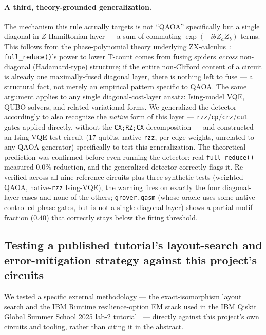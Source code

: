 \documentclass[9pt,twocolumn]{extarticle}
\begin{document}
\paragraph{A third, theory-grounded generalization.} The mechanism this
rule actually targets is not ``QAOA'' specifically but a single
diagonal-in-$Z$ Hamiltonian layer --- a sum of commuting
$\exp(-i\theta Z_aZ_b)$ terms. This follows from the phase-polynomial
theory underlying ZX-calculus~\cite{kissinger2019reducing}:
\texttt{full\_reduce()}'s power to lower T-count comes from fusing spiders
\emph{across} non-diagonal (Hadamard-type) structure; if the entire
non-Clifford content of a circuit is already one maximally-fused diagonal
layer, there is nothing left to fuse --- a structural fact, not merely an
empirical pattern specific to QAOA. The same argument applies to any
single diagonal-cost-layer ansatz: Ising-model VQE, QUBO solvers, and
related variational forms. We generalized the detector accordingly to
also recognize the \emph{native} form of this layer ---
\texttt{rzz}/\texttt{cp}/\texttt{crz}/\texttt{cu1} gates applied directly,
without the \texttt{CX;RZ;CX} decomposition --- and constructed an
Ising-VQE test circuit (17 qubits, native \texttt{rzz}, per-edge weights,
unrelated to any QAOA generator) specifically to test this
generalization. The theoretical prediction was confirmed before even
running the detector: real \texttt{full\_reduce()} measured $0.0\%$
reduction, and the generalized detector correctly flags it. Re-verified
across all nine reference circuits plus three synthetic tests (weighted
QAOA, native-\texttt{rzz} Ising-VQE), the warning fires on exactly the
four diagonal-layer cases and none of the others; \texttt{grover.qasm}
(whose oracle uses some native controlled-phase gates, but is not a
single diagonal layer) shows a partial motif fraction ($0.40$) that
correctly stays below the firing threshold.

\subsection{Testing a published tutorial's layout-search and error-mitigation strategy against this project's circuits}
\label{sec:qgss-comparison}
We tested a specific external methodology --- the exact-isomorphism layout
search and the IBM Runtime resilience-option EM stack used in the IBM
Qiskit Global Summer School 2025 lab-2 tutorial~\cite{qgss2025lab2} ---
directly against this project's own circuits and tooling, rather than
citing it in the abstract.
\end{document}
